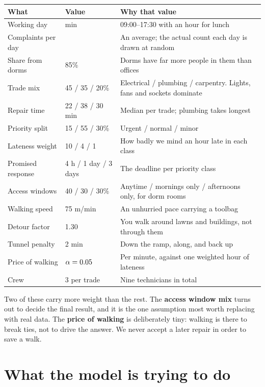 \documentclass[11pt]{article}
\newcommand{\num}[1]{#1}
\begin{document}
\begin{center}\small
\begin{tabular}{@{}llp{7.4cm}@{}}
\toprule
\textbf{What} & \textbf{Value} & \textbf{Why that value} \\
\midrule
Working day & \NWorkingMinutes{} min & 09:00--17:30 with an hour for lunch \\
Complaints per day & \NTicketsPerDay{} & An average; the actual count each day is drawn at random \\
Share from dorms & 85\% & Dorms have far more people in them than offices \\
Trade mix & 45 / 35 / 20\% & Electrical / plumbing / carpentry. Lights, fans and sockets dominate \\
Repair time & 22 / 38 / 30 min & Median per trade; plumbing takes longest \\
Priority split & 15 / 55 / 30\% & Urgent / normal / minor \\
Lateness weight & 10 / 4 / 1 & How badly we mind an hour late in each class \\
Promised response & 4 h / 1 day / 3 days & The deadline per priority class \\
Access windows & 40 / 30 / 30\% & Anytime / mornings only / afternoons only, for dorm rooms \\
Walking speed & 75 m/min & An unhurried pace carrying a toolbag \\
Detour factor & \num{1.30} & You walk around lawns and buildings, not through them \\
Tunnel penalty & 2 min & Down the ramp, along, and back up \\
Price of walking & $\alpha=0.05$ & Per minute, against one weighted hour of lateness \\
Crew & 3 per trade & Nine technicians in total \\
\bottomrule
\end{tabular}
\end{center}

Two of these carry more weight than the rest. The \textbf{access window mix}
turns out to decide the final result, and it is the one assumption most worth
replacing with real data. The \textbf{price of walking} is deliberately tiny:
walking is there to break ties, not to drive the answer. We never accept a
later repair in order to save a walk.

\section{What the model is trying to do}
\end{document}
